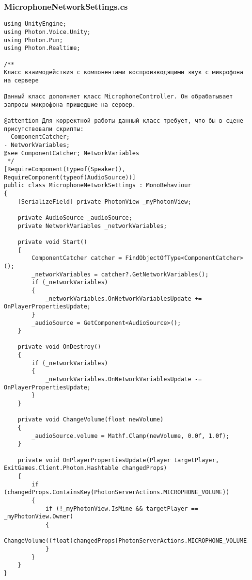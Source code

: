 \subsubsection*{MicrophoneNetworkSettings.cs}
\begin{verbatim}
﻿using UnityEngine;
using Photon.Voice.Unity;
using Photon.Pun;
using Photon.Realtime;

/**
Класс взаимодействия с компонентами воспроизводящими звук с микрофона на сервере

Данный класс дополняет класс MicrophoneController. Он обрабатывает запросы микрофона пришедшие на сервер.

@attention Для корректной работы данный класс требует, что бы в сцене присутствовали скрипты:
- ComponentCatcher;
- NetworkVariables;
@see ComponentCatcher; NetworkVariables 
 */
[RequireComponent(typeof(Speaker)), RequireComponent(typeof(AudioSource))]
public class MicrophoneNetworkSettings : MonoBehaviour
{
    [SerializeField] private PhotonView _myPhotonView;

    private AudioSource _audioSource;
    private NetworkVariables _networkVariables;

    private void Start()
    {
        ComponentCatcher catcher = FindObjectOfType<ComponentCatcher>();
        _networkVariables = catcher?.GetNetworkVariables();
        if (_networkVariables)
        {
            _networkVariables.OnNetworkVariablesUpdate += OnPlayerPropertiesUpdate;
        }
        _audioSource = GetComponent<AudioSource>();
    }

    private void OnDestroy()
    {
        if (_networkVariables)
        {
            _networkVariables.OnNetworkVariablesUpdate -= OnPlayerPropertiesUpdate;
        }
    }

    private void ChangeVolume(float newVolume)
    {
        _audioSource.volume = Mathf.Clamp(newVolume, 0.0f, 1.0f);
    }

    private void OnPlayerPropertiesUpdate(Player targetPlayer, ExitGames.Client.Photon.Hashtable changedProps)
    {
        if (changedProps.ContainsKey(PhotonServerActions.MICROPHONE_VOLUME))
        {
            if (!_myPhotonView.IsMine && targetPlayer == _myPhotonView.Owner)
            {
                ChangeVolume((float)changedProps[PhotonServerActions.MICROPHONE_VOLUME]);
            }
        }
    }
}

\end{verbatim}
